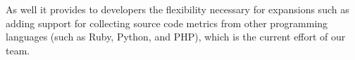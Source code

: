 As well it provides to developers the flexibility necessary for expansions such as
adding support for collecting source code metrics from other programming
languages (such as Ruby, Python, and PHP), which is the current effort of our team.

\begin{comment}

\section*{Acknowledgment}

The authors of this paper were supported by Brazilian Nation Research Council
(CNPq) and Ministry of Planning, Budget, and Management (MP) of Brazil. 
%
The Mezuro has been developed as a project of the FLOSS Competence Center
(CCSL) at University of São Paulo (USP) and it is part of the new Brazilian
Public Software (SPB) Portal.
%
The authors would like to thank Dr. Alfredo Goldman for his collaborations
through the eXtreme Programming Laboratory course.
%
Also, a special thanks to other (previous and current) Mezuro oficial developers:
Alessandro Palmeira,
Carlos Morais,
Daniel Paulino,
Fellipe Souto,
Guilherme Rojas,
Heitor Reis,
João da Silva, and
Renan Fichberg.

\end{comment}

